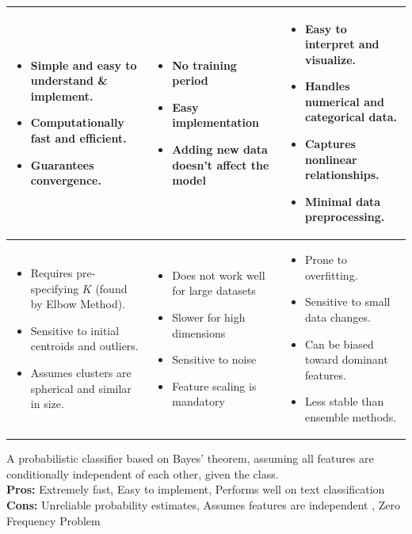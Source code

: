 \begin{landscape}
\begin{tabularx}{\linewidth}{|X|X|X|}
\begin{itemize}[leftmargin=*]
   \item Simple and easy to understand \& implement.
   \item Computationally fast and efficient.
   \item Guarantees convergence.
\end{itemize}
&
\begin{itemize}[leftmargin=*]
   \item No training period
   \item Easy implementation
   \item Adding new data doesn't affect the model
\end{itemize}
&
\begin{itemize}[leftmargin=*]
   \item Easy to interpret and visualize.
   \item Handles numerical and categorical data.
   \item Captures nonlinear relationships.
   \item Minimal data preprocessing.
\end{itemize}
\\\hline

\begin{itemize}[leftmargin=*]
   \item Requires pre-specifying $K$ (found by Elbow Method).
   \item Sensitive to initial centroids and outliers.
   \item Assumes clusters are spherical and similar in size.
\end{itemize}
&
\begin{itemize}[leftmargin=*]
   \item Does not work well for large datasets
   \item Slower for high dimensions
   \item Sensitive to noise
   \item Feature scaling is mandatory
\end{itemize}
&
\begin{itemize}[leftmargin=*]
   \item Prone to overfitting.
   \item Sensitive to small data changes.
   \item Can be biased toward dominant features.
   \item Less stable than ensemble methods.
\end{itemize}

\\\hline
\end{tabularx}

A probabilistic classifier based on Bayes' theorem, assuming all features are conditionally independent of each other, given the class. \\
\textbf{Pros:} Extremely fast, Easy to implement, Performs well on text classification \\
\textbf{Cons:} Unreliable probability estimates, Assumes features are independent , Zero Frequency Problem
\end{landscape}
